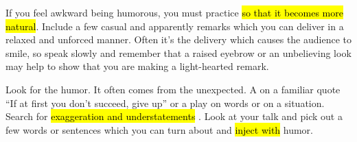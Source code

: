 If you feel awkward being humorous, you must practice 
\hl{so that it becomes more natural}.
 Include a few casual and apparently 
 remarks which you can deliver in a relaxed and unforced manner. Often it’s the delivery which causes the audience to smile, so speak slowly and remember that a raised eyebrow or an unbelieving look may help to show that you are making a light-hearted remark.

Look for the humor. It often comes from the unexpected. A 
 on a familiar quote “If at first you don’t succeed, give up” or a play on words or on a situation. Search for 
\hl{exaggeration and understatements}
. Look at your talk and pick out a few words or sentences which you can 
turn about 
and 
\hl{inject with}
 humor.


